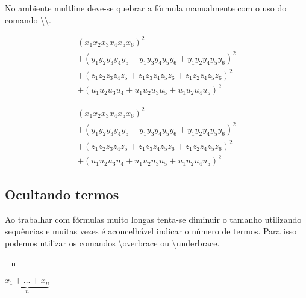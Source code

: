 No ambiente \textsf{multline} deve-se quebrar a fórmula manualmente com o uso do comando \textbackslash\textbackslash. \\
\begin{minipage}[t]{0.47\linewidth} \vspace{-8pt}
    \begin{latexcode}
        \begin{multline}
            (x_{1} x_{2} x_{3} x_{4} x_{5} x_{6})^{2}\\
            + (y_{1} y_{2} y_{3} y_{4} y_{5}
            + y_{1} y_{3} y_{4} y_{5} y_{6}
            + y_{1} y_{2} y_{4} y_{5} y_{6})^{2}\\
            + (z_{1} z_{2} z_{3} z_{4} z_{5}
            + z_{1} z_{3} z_{4} z_{5} z_{6}
            + z_{1} z_{2} z_{4} z_{5} z_{6})^{2}\\
            + (u_{1} u_{2} u_{3} u_{4} + u_{1} u_{2} u_{3} u_{5}
            + u_{1} u_{2} u_{4} u_{5})^{2}
        \end{multline}
    \end{latexcode}
\end{minipage} \hfill
\begin{minipage}[t]{0.47\linewidth} \vspace{0pt}
    \begin{multline}
        (x_{1} x_{2} x_{3} x_{4} x_{5} x_{6})^{2}\\
        + (y_{1} y_{2} y_{3} y_{4} y_{5}
        + y_{1} y_{3} y_{4} y_{5} y_{6}
        + y_{1} y_{2} y_{4} y_{5} y_{6})^{2}\\
        + (z_{1} z_{2} z_{3} z_{4} z_{5}
        + z_{1} z_{3} z_{4} z_{5} z_{6}
        + z_{1} z_{2} z_{4} z_{5} z_{6})^{2}\\
        + (u_{1} u_{2} u_{3} u_{4} + u_{1} u_{2} u_{3} u_{5}
        + u_{1} u_{2} u_{4} u_{5})^{2}
    \end{multline}
\end{minipage}

\subsection{Ocultando termos}
Ao trabalhar com fórmulas muito longas tenta-se diminuir o tamanho utilizando sequências e muitas vezes é aconcelhável indicar o número de termos. Para isso podemos utilizar os comandos \textbackslash\textsf{overbrace} ou \textbackslash\textsf{underbrace}. \\
\begin{minipage}[t]{0.47\linewidth} \vspace{-8pt}
    \begin{latexcode}
        _n
    \end{latexcode}
\end{minipage} \hfill
\begin{minipage}[t]{0.47\linewidth}
    \vspace{0pt}
    $\underbrace{x_1 + \dots + x_n}_n$
\end{minipage}

